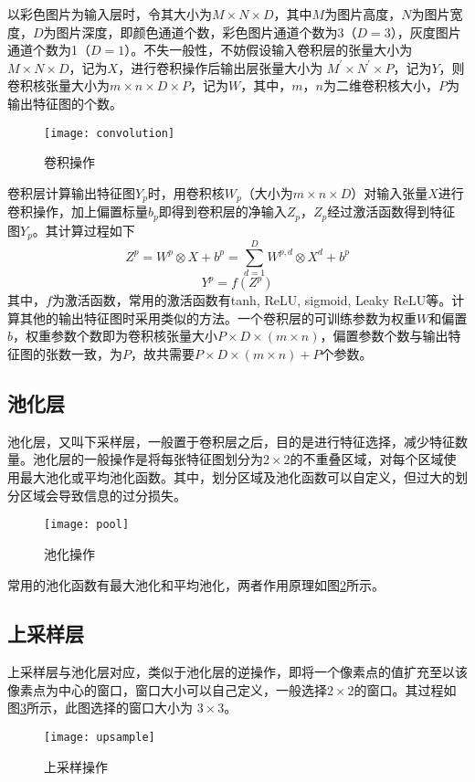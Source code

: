 \documentclass[a4paper, 12pt, oneside]{report}
\begin{document}
{以彩色图片为输入层时，令其大小为$M \times N \times D$，其中$M$为图片高度，$N$为图片宽度，$D$为图片深度，即颜色通道个数，彩色图片通道个数为3（$D = 3$），灰度图片通道个数为1（$D = 1$）。不失一般性，不妨假设输入卷积层的张量大小为$M \times N \times D$，记为$X$，进行卷积操作后输出层张量大小为 $M^{\prime} \times N^{\prime} \times P$，记为$Y$，则卷积核张量大小为$m \times n \times D \times P$，记为$W$，其中，$m$，$n$为二维卷积核大小，$P$为输出特征图的个数。
\begin{figure}[H]
\centering
\texttt{[image: convolution]}
\caption{卷积操作}
\label{fig:3.1}
\end{figure}

卷积层计算输出特征图$Y_p$时，用卷积核$W_p$（大小为$m \times n \times D$）对输入张量$X$进行卷积操作，加上偏置标量$b_p$即得到卷积层的净输入$Z_p$，$Z_p$经过激活函数得到特征图$Y_p$。其计算过程如下
\begin{equation} \label{eq:3.1}
Z^p = W^p \otimes X + b^p = \sum_{d = 1}^D W^{p, d} \otimes X^d + b^p
\end{equation}
\begin{equation} \label{eq:3.2}
Y^p = f(Z^p)
\end{equation}
其中，$f$为激活函数，常用的激活函数有tanh, ReLU, sigmoid, Leaky ReLU等。计算其他的输出特征图时采用类似的方法。一个卷积层的可训练参数为权重$W$和偏置$b$，权重参数个数即为卷积核张量大小$P \times D \times (m \times n)$，偏置参数个数与输出特征图的张数一致，为$P$，故共需要$P \times D \times (m \times n) + P$个参数。

\subsection{池化层\quad}
池化层，又叫下采样层，一般置于卷积层之后，目的是进行特征选择，减少特征数量。池化层的一般操作是将每张特征图划分为$2\times 2$的不重叠区域，对每个区域使用最大池化或平均池化函数。其中，划分区域及池化函数可以自定义，但过大的划分区域会导致信息的过分损失。

\begin{figure}[h]
\centering
\texttt{[image: pool]}
\caption{池化操作}
\label{fig:3.2}
\end{figure}
常用的池化函数有最大池化和平均池化，两者作用原理如图\ref{fig:3.2}所示。

\subsection{上采样层\quad}
上采样层与池化层对应，类似于池化层的逆操作，即将一个像素点的值扩充至以该像素点为中心的窗口，窗口大小可以自己定义，一般选择$2\times 2$的窗口。其过程如图\ref{fig:3.3}所示，此图选择的窗口大小为 $3 \times 3$。
\begin{figure}[h]
\centering
\texttt{[image: upsample]}
\caption{上采样操作}
\label{fig:3.3}
\end{figure}

}
\end{document}
